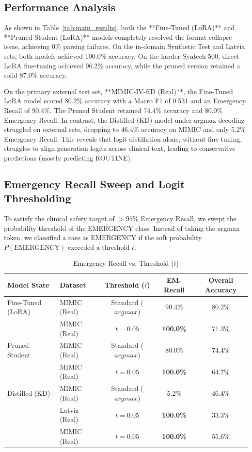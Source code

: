 \documentclass[a4paper, 12pt]{article}
\begin{document}
\subsection{Performance Analysis}
As shown in Table~\ref{tab:main_results}, both the **Fine-Tuned (LoRA)** and **Pruned Student (LoRA)** models completely resolved the format collapse issue, achieving 0\% parsing failures. On the in-domain Synthetic Test and Latvia sets, both models achieved 100.0\% accuracy. On the harder Syntech-500, direct LoRA fine-tuning achieved 96.2\% accuracy, while the pruned version retained a solid 87.0\% accuracy. 

On the primary external test set, **MIMIC-IV-ED (Real)**, the Fine-Tuned LoRA model scored 80.2\% accuracy with a Macro F1 of 0.531 and an Emergency Recall of 90.4\%. The Pruned Student retained 74.4\% accuracy and 80.0\% Emergency Recall. In contrast, the Distilled (KD) model under argmax decoding struggled on external sets, dropping to 46.4\% accuracy on MIMIC and only 5.2\% Emergency Recall. This reveals that logit distillation alone, without fine-tuning, struggles to align generation logits across clinical text, leading to conservative predictions (mostly predicting ROUTINE).

\subsection{Emergency Recall Sweep and Logit Thresholding}
To satisfy the clinical safety target of $>95\%$ Emergency Recall, we swept the probability threshold of the EMERGENCY class. Instead of taking the argmax token, we classified a case as EMERGENCY if the soft probability $P(\text{EMERGENCY})$ exceeded a threshold $t$. 

\begin{table}[h]
\centering
\caption{Emergency Recall vs. Threshold ($t$)}
\label{tab:logit_sweep}
\begin{tabular}{llccc}
\toprule
Model State & Dataset & Threshold ($t$) & EM-Recall & Overall Accuracy \\
\midrule
Fine-Tuned (LoRA) & MIMIC (Real) & Standard ($argmax$) & 90.4\% & 80.2\% \\
                  & MIMIC (Real) & $t = 0.05$ & \textbf{100.0\%} & 71.3\% \\
\midrule
Pruned Student    & MIMIC (Real) & Standard ($argmax$) & 80.0\% & 74.4\% \\
                  & MIMIC (Real) & $t = 0.05$ & \textbf{100.0\%} & 64.7\% \\
\midrule
Distilled (KD)    & MIMIC (Real) & Standard ($argmax$) & 5.2\% & 46.4\% \\
                  & Latvia (Real) & $t = 0.05$ & \textbf{100.0\%} & 33.3\% \\
                  & MIMIC (Real) & $t = 0.05$ & \textbf{100.0\%} & 55.6\% \\
\bottomrule
\end{tabular}
\end{table}
\end{document}
